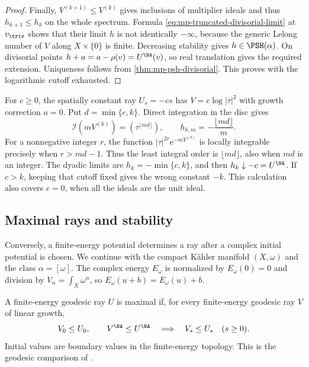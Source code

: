 \begin{proof}
Finally, $V^{(k+1)}\leq V^{(k)}$ gives inclusions of multiplier ideals and thus $h_{k+1}\leq h_k$ on the whole spectrum. Formula \eqref{eq:mp-truncated-divisorial-limit} at $v_{\triv}$ shows that their limit $h$ is not identically $-\infty$, because the generic Lelong number of $V$ along $X\times\{0\}$ is finite. Decreasing stability gives $h\in\PSH(\alpha)$. On divisorial points $h+a=a-\rho(v)=U^{\NA}(v)$, so real translation gives the required extension. Uniqueness follows from \cref{thm:mp-psh-divisorial}. This proves \cite[Theorem~5.1.4]{MPTropicalV2} with the logarithmic cutoff exhausted.
\end{proof}

\begin{example}\label{ex:mp-logarithmic-cutoff}
For $c\geq0$, the spatially constant ray $U_s=-cs$ has $V=c\log|\tau|^2$ with growth correction $a=0$. Put $d=\min\{c,k\}$. Direct integration in the disc gives
\[
 \mathcal I(mV^{(k)})=(\tau^{\lfloor md\rfloor}),\qquad
             h_{k,m}=-\frac{\lfloor md\rfloor}{m}.
\]
For a nonnegative integer $r$, the function $|\tau|^{2r}\mathrm e^{-mV^{(k)}}$ is locally integrable precisely when $r>md-1$. Thus the least integral order is $\lfloor md\rfloor$, also when $md$ is an integer. The dyadic limits are $h_k=-\min\{c,k\}$, and then $h_k\downarrow-c=U^{\NA}$. If $c>k$, keeping that cutoff fixed gives the wrong constant $-k$. This calculation also covers $c=0$, when all the ideals are the unit ideal.
\end{example}

\subsection{Maximal rays and stability}
\label{subsec:mp-psh-maximal-rays}

Conversely, a finite-energy potential determines a ray after a complex initial potential is chosen. We continue with the compact K\"ahler manifold $(X,\omega)$ and the class $\alpha=[\omega]$. The complex energy $E_\omega$ is normalized by $E_\omega(0)=0$ and division by $V_\alpha=\int_X\omega^n$, so $E_\omega(u+b)=E_\omega(u)+b$.

\begin{definition}\label{def:mp-maximal-ray}
A finite-energy geodesic ray $U$ is maximal if, for every finite-energy geodesic ray $V$ of linear growth,
\[
 V_0\leq U_0,\qquad V^{\NA}\leq U^{\NA}
 \quad\Longrightarrow\quad V_s\leq U_s\quad(s\geq0).
\]
Initial values are boundary values in the finite-energy topology. This is the geodesic comparison of \cite[Definition~5.1.6]{MPTropicalV2}.
\end{definition}

